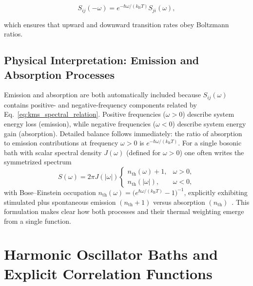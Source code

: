 \begin{equation}
	S_{ij}(-\omega) = e^{-\hbar\omega/(k_{\mathrm{B}} T)} S_{ji}(\omega),
	\label{eq:kms_spectral_relation}
\end{equation}

\noindent
which ensures that upward and downward transition rates obey Boltzmann ratios.

\subsection{Physical Interpretation: Emission and Absorption Processes}
\label{subsec:physical_emission_absorption}

\noindent
Emission and absorption are both automatically included because $S_{ij}(\omega)$ contains positive- and negative-frequency components related by Eq.~\eqref{eq:kms_spectral_relation}. Positive frequencies ($\omega>0$) describe system energy loss (emission), while negative frequencies ($\omega<0$) describe system energy gain (absorption). Detailed balance follows immediately: the ratio of absorption to emission contributions at frequency $\omega>0$ is $e^{-\hbar \omega/(k_{\mathrm{B}}T)}$. For a single bosonic bath with scalar spectral density $J(\omega)$ (defined for $\omega>0$) one often writes the symmetrized spectrum
\begin{equation}
	S(\omega) = 2\pi J(|\omega|) \begin{cases} n_{\text{th}}(\omega)+1, & \omega>0, \\ n_{\text{th}}(|\omega|), & \omega<0, \end{cases}
	\label{eq:bose_symmetric_spectrum}
\end{equation}
with Bose--Einstein occupation $n_{\text{th}}(\omega) = \big(e^{\hbar\omega/(k_{\mathrm{B}}T)}-1\big)^{-1}$, explicitly exhibiting stimulated plus spontaneous emission $(n_{\text{th}}+1)$ versus absorption $(n_{\text{th}})$~\cite{weiss2012quantumdissipativesystems}. This formulation makes clear how both processes and their thermal weighting emerge from a single function.


\section{Harmonic Oscillator Baths and Explicit Correlation Functions}
\label{sec:harmonic_oscillator_bath_correlation_functions}

